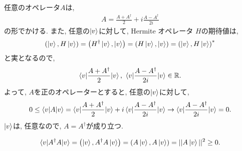 \begin{ex}
    \label{ex2.24}
    任意のオペレータ$A$は,
    \begin{align*}
        A = \frac{A + A^\dagger}{2} + i \frac{A-A^\dagger}{2i}
    \end{align*}
    の形でかける.
    また, 任意の$\ket{v}$に対して, Hermite オペレータ $H$の期待値は,
    \begin{align*}
        \left( \ket{v}, H \ket{v} \right)
        = \left( H^\dagger \ket{v}, \ket{v} \right)
        = \left( H \ket{v}, \ket{v} \right)
        = \left( \ket{v}, H \ket{v} \right)^*
    \end{align*}
    と実となるので,
    \begin{align*}
        \braket{v|\frac{A + A^\dagger}{2}|v}
        ,\ \braket{v|\frac{A-A^\dagger}{2i}|v}
        \in \mathbb{R}.
    \end{align*}
    よって, $A$を正のオペレーターとすると, 任意の$\ket{v}$に対して,
    \begin{align*}
        0 \leq \braket{v|A|v}
        = \braket{v|\frac{A + A^\dagger}{2}|v}
        + i \braket{v|\frac{A-A^\dagger}{2i}|v}
        \to
        \braket{v|\frac{A-A^\dagger}{2i}|v} = 0.
    \end{align*}
    $\ket{v}$は, 任意なので, $A = A^\dagger$が成り立つ.
\end{ex}

\begin{ex}
    \label{ex2.25}
    \begin{align*}
        \braket{v|A^\dagger A | v}
        = \left(\ket{v}, A^\dagger A\ket{v} \right)
        = \left(A \ket{v},A\ket{v} \right)
        = || A \ket{v}|| ^2 \geq 0.
    \end{align*}
\end{ex}


